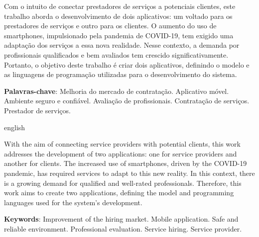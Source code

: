 \setlength{\absparsep}{18pt} %
\begin{resumo}
	\SingleSpacing

	Com o intuito de conectar prestadores de serviços a potenciais clientes, este trabalho aborda o desenvolvimento de dois aplicativos: um voltado para os prestadores de serviços e outro para os clientes. O aumento do uso de smartphones, impulsionado pela pandemia de COVID-19, tem exigido uma adaptação dos serviços a essa nova realidade. Nesse contexto, a demanda por profissionais qualificados e bem avaliados tem crescido significativamente. Portanto, o objetivo deste trabalho é criar dois aplicativos, definindo o modelo e as linguagens de programação utilizadas para o desenvolvimento do sistema.
	
	\textbf{Palavras-chave}: Melhoria do mercado de contratação. Aplicativo móvel. Ambiente seguro e confiável. Avaliação de profissionais. Contratação de serviços. Prestador de serviços.
\end{resumo}

\begin{resumo}[Abstract]
	\SingleSpacing
	\begin{otherlanguage*}{english}

		With the aim of connecting service providers with potential clients, this work addresses the development of two applications: one for service providers and another for clients. The increased use of smartphones, driven by the COVID-19 pandemic, has required services to adapt to this new reality. In this context, there is a growing demand for qualified and well-rated professionals. Therefore, this work aims to create two applications, defining the model and programming languages used for the system's development.
		
		\textbf{Keywords}: Improvement of the hiring market. Mobile application. Safe and reliable environment. Professional evaluation. Service hiring. Service provider.
	\end{otherlanguage*}
\end{resumo}

% 
%
%  

